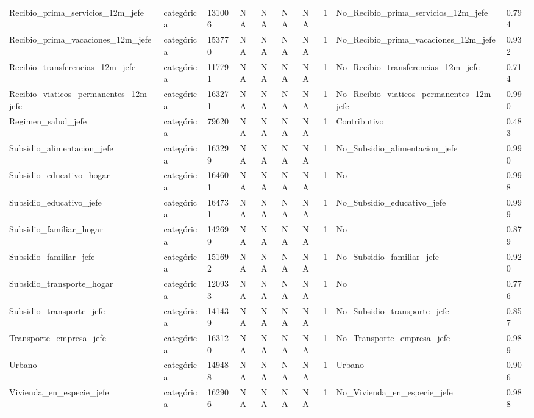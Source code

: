\begin{longtable}[t]{llllllllll}
Recibio\_prima\_servicios\_12m\_jefe & categórica & 131006 & NA & NA & NA & NA & 1 & No\_Recibio\_prima\_servicios\_12m\_jefe & 0.794\\
Recibio\_prima\_vacaciones\_12m\_jefe & categórica & 153770 & NA & NA & NA & NA & 1 & No\_Recibio\_prima\_vacaciones\_12m\_jefe & 0.932\\
Recibio\_transferencias\_12m\_jefe & categórica & 117791 & NA & NA & NA & NA & 1 & No\_Recibio\_transferencias\_12m\_jefe & 0.714\\
Recibio\_viaticos\_permanentes\_12m\_jefe & categórica & 163271 & NA & NA & NA & NA & 1 & No\_Recibio\_viaticos\_permanentes\_12m\_jefe & 0.990\\
Regimen\_salud\_jefe & categórica & 79620 & NA & NA & NA & NA & 1 & Contributivo & 0.483\\
Subsidio\_alimentacion\_jefe & categórica & 163299 & NA & NA & NA & NA & 1 & No\_Subsidio\_alimentacion\_jefe & 0.990\\
Subsidio\_educativo\_hogar & categórica & 164601 & NA & NA & NA & NA & 1 & No & 0.998\\
Subsidio\_educativo\_jefe & categórica & 164731 & NA & NA & NA & NA & 1 & No\_Subsidio\_educativo\_jefe & 0.999\\
Subsidio\_familiar\_hogar & categórica & 142699 & NA & NA & NA & NA & 1 & No & 0.879\\
Subsidio\_familiar\_jefe & categórica & 151692 & NA & NA & NA & NA & 1 & No\_Subsidio\_familiar\_jefe & 0.920\\
Subsidio\_transporte\_hogar & categórica & 120933 & NA & NA & NA & NA & 1 & No & 0.776\\
Subsidio\_transporte\_jefe & categórica & 141439 & NA & NA & NA & NA & 1 & No\_Subsidio\_transporte\_jefe & 0.857\\
Transporte\_empresa\_jefe & categórica & 163120 & NA & NA & NA & NA & 1 & No\_Transporte\_empresa\_jefe & 0.989\\
Urbano & categórica & 149488 & NA & NA & NA & NA & 1 & Urbano & 0.906\\
Vivienda\_en\_especie\_jefe & categórica & 162906 & NA & NA & NA & NA & 1 & No\_Vivienda\_en\_especie\_jefe & 0.988\\*
\end{longtable}